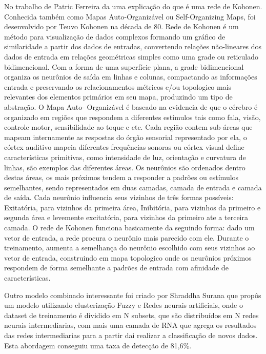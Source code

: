 No trabalho de Patric Ferreira \cite{Patric} da uma explicação do que é uma rede de Kohonen. 
Conhecida também como Mapas Auto-Organizável ou Self-Organizing Maps, foi desenvolvido por Teuvo Kohonen na década de 80. 
Rede de Kohonen é um método para visualização de dados complexos formando um gráfico de similaridade a partir dos dados de entradas, convertendo relações não-lineares dos dados de entrada em relações geométricas simples como uma grade ou reticulado bidimencional. 
Com a forma de uma superfície plana, a grade bidimencional organiza os neurônios de saída em linhas e colunas, compactando as informações entrada e preservando os relacionamentos métricos e/ou topologico mais relevantes dos elementos primários em seu mapa, produzindo um tipo de abstração. 
O Mapa Auto- Organizável é baseado na evidencia de que o cérebro é organizado em regiões que respondem a diferentes estímulos tais como fala, visão, controle motor, sensibilidade ao toque e etc. Cada região contem sub-áreas que mapeam internamente as respostas do órgão sensorial representado por ela, o córtex auditivo mapeia diferentes frequências sonoras ou córtex visual define características primitivas, como intensidade de luz, orientação e curvatura de linhas, são exemplos das diferentes áreas. Os neurônios são ordenados dentro destas áreas, os mais próximos tendem a responder a padrões ou estímulos semelhantes, sendo representados em duas camadas, camada de entrada e camada de saída. Cada neurônio influencia seus vizinhos de três formas possíveis: Exitatória, para vizinhos da primeira área, Inibitória, para vizinhos da  primeiro e segunda área e levemente excitatória, para vizinhos da primeiro ate a terceira camada. 
O rede de Kohonen funciona basicamente da seguindo forma: dado um vetor de entrada, a rede procura o neurônio mais parecido com ele. Durante o treinamento, aumenta a semelhança do neurônio escolhido com seus vizinhos ao vetor de entrada, construindo em mapa topologico onde os neurônios próximos respondem de forma semelhante a padrões de entrada com afinidade de características.


Outro modelo combinado interessante foi criado por Shraddha Surana \cite{Surana} que propôs um modelo utilizando clusterização Fuzzy e Redes neurais artificiais, onde o dataset de treinamento é dividido em N subsets, que são distribuídos em N redes neurais intermediarias, com mais uma camada de RNA que agrega os resultados das redes intermediarias para a partir dai realizar a classificação de novos dados. Esta abordagem conseguiu uma taxa de detecção de 81,6\%.

